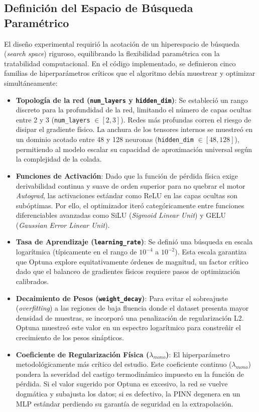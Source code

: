 \documentclass[a4paper, 12pt, twocolumn]{book}
\begin{document}
\subsection{Definición del Espacio de Búsqueda Paramétrico}

El diseño experimental requirió la acotación de un hiperespacio de búsqueda (\textit{search space}) riguroso, equilibrando la flexibilidad paramétrica con la tratabilidad computacional. En el código implementado, se definieron cinco familias de hiperparámetros críticos que el algoritmo debía muestrear y optimizar simultáneamente:

\begin{itemize}
    \item \textbf{Topología de la red (\texttt{num\_layers} y \texttt{hidden\_dim})}: Se estableció un rango discreto para la profundidad de la red, limitando el número de capas ocultas entre 2 y 3 (\texttt{num\_layers} $\in [2, 3]$). Redes más profundas corren el riesgo de disipar el gradiente físico. La anchura de los tensores internos se muestreó en un dominio acotado entre 48 y 128 neuronas (\texttt{hidden\_dim} $\in [48, 128]$), permitiendo al modelo escalar su capacidad de aproximación universal según la complejidad de la colada.
    
    \item \textbf{Funciones de Activación}: Dado que la función de pérdida física exige derivabilidad continua y suave de orden superior para no quebrar el motor \textit{Autograd}, las activaciones estándar como ReLU en las capas ocultas son subóptimas. Por ello, el optimizador iteró categóricamente entre funciones diferenciables avanzadas como SiLU (\textit{Sigmoid Linear Unit}) y GELU (\textit{Gaussian Error Linear Unit}).
    
    \item \textbf{Tasa de Aprendizaje (\texttt{learning\_rate})}: Se definió una búsqueda en escala logarítmica (típicamente en el rango de $10^{-4}$ a $10^{-2}$). Esta escala garantiza que Optuna explore equitativamente órdenes de magnitud, un factor crítico dado que el balanceo de gradientes físicos requiere pasos de optimización calibrados.
    
    \item \textbf{Decaimiento de Pesos (\texttt{weight\_decay})}: Para evitar el sobreajuste (\textit{overfitting}) a las regiones de baja fluencia donde el dataset presenta mayor densidad de muestras, se incorporó una penalización de regularización L2. Optuna muestreó este valor en un espectro logarítmico para constreñir el crecimiento de los pesos sinápticos.
    
    \item \textbf{Coeficiente de Regularización Física ($\lambda_{mono}$)}: El hiperparámetro metodológicamente más crítico del estudio. Este coeficiente continuo ($\lambda_{mono}$) pondera la severidad del castigo termodinámico impuesto en la función de pérdida. Si el valor sugerido por Optuna es excesivo, la red se vuelve dogmática y subajusta los datos; si es defectivo, la PINN degenera en un MLP estándar perdiendo su garantía de seguridad en la extrapolación.
\end{itemize}
\end{document}
